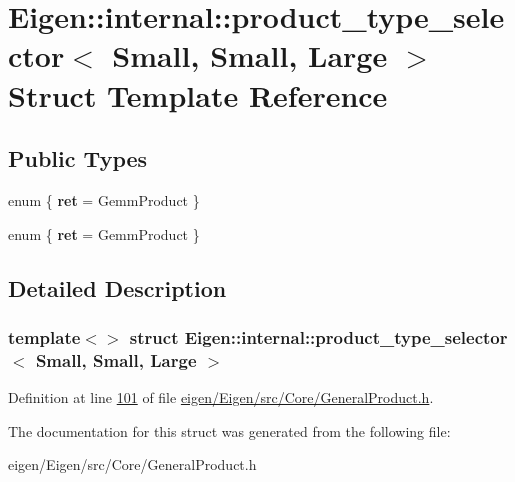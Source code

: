 \hypertarget{struct_eigen_1_1internal_1_1product__type__selector_3_01_small_00_01_small_00_01_large_01_4}{}\section{Eigen\+:\+:internal\+:\+:product\+\_\+type\+\_\+selector$<$ Small, Small, Large $>$ Struct Template Reference}
\label{struct_eigen_1_1internal_1_1product__type__selector_3_01_small_00_01_small_00_01_large_01_4}
\subsection*{Public Types}
\begin{DoxyCompactItemize}
\item 
\mbox{\label{struct_eigen_1_1internal_1_1product__type__selector_3_01_small_00_01_small_00_01_large_01_4_ae2a7be4023f9bc8ddbad220e25b3c2d2}} 
enum \{ {\bfseries ret} = Gemm\+Product
 \}
\item 
\mbox{\label{struct_eigen_1_1internal_1_1product__type__selector_3_01_small_00_01_small_00_01_large_01_4_ae92540e4f06735615116f2cf58677f26}} 
enum \{ {\bfseries ret} = Gemm\+Product
 \}
\end{DoxyCompactItemize}


\subsection{Detailed Description}
\subsubsection*{template$<$$>$\newline
struct Eigen\+::internal\+::product\+\_\+type\+\_\+selector$<$ Small, Small, Large $>$}



Definition at line \hyperlink{eigen_2_eigen_2src_2_core_2_general_product_8h_source_l00101}{101} of file \hyperlink{eigen_2_eigen_2src_2_core_2_general_product_8h_source}{eigen/\+Eigen/src/\+Core/\+General\+Product.\+h}.



The documentation for this struct was generated from the following file\+:\begin{DoxyCompactItemize}
\item 
eigen/\+Eigen/src/\+Core/\+General\+Product.\+h\end{DoxyCompactItemize}
